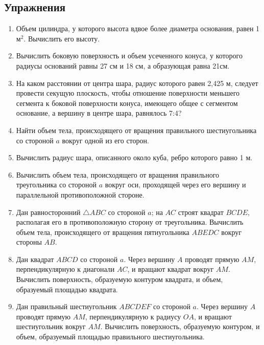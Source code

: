 \documentclass[twoside]{book}
\begin{document}
\subsection*{Упражнения}

\begin{enumerate}

\item 
Объем цилиндра, у которого высота вдвое более диаметра основания, равен 1 м$^2$.
Вычислить его высоту.

\item
Вычислить боковую поверхность и объем усеченного конуса, у которого радиусы оснований равны 27 см и 18 см, а образующая равна 21см.

\item
На каком расстоянии от центра шара, радиус которого равен 2,425 м, следует провести секущую плоскость, чтобы отношение поверхности меньшего сегмента к боковой поверхности конуса, имеющего общее с сегментом основание, а вершину в центре шара, равнялось 7:4?

\item
Найти объем тела, происходящего от вращения правильного шестиугольника со стороной $a$ вокруг одной из его сторон.

\item
Вычислить радиус шара, описанного около куба, ребро которого равно 1 м.

\item
Вычислить объем тела, происходящего от вращения правильного треугольника со стороной $a$ вокруг оси, проходящей через его вершину и параллельной противоположной стороне.

\item
Дан равносторонний $\triangle ABC$ со стороной $a$;
на $AC$ строят квадрат $BCDE$, располагая его в противоположную сторону от треугольника.
Вычислить объем тела, происходящего от вращения пятиугольника $ABEDC$ вокруг стороны $AB$.

\item
Дан квадрат $ABCD$ со стороной $a$.
Через вершину $A$ проводят прямую $AM$, перпендикулярную к диагонали $AC$, и вращают квадрат вокруг $AM$.
Вычислить поверхность, образуемую контуром квадрата, и объем, образуемый площадью квадрата.

\item
Дан правильный шестиугольник $ABCDEF$ со стороной $a$.
Через вершину $A$ проводят прямую $AM$, перпендикулярную к радиусу $OA$, и вращают шестиугольник вокруг $AM$.
Вычислить поверхность, образуемую контуром, и объем, образуемый площадью правильного шестиугольника.


\end{enumerate}
\end{document}
